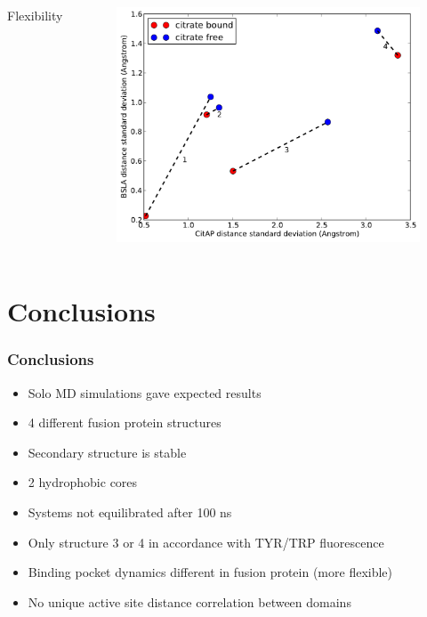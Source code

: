 \documentclass[english]{beamer}
\begin{document}
\begin{frame}
\begin{columns}[]
        \vfill
        \centering
        Flexibility
        \begin{figure}
            \includegraphics[width=\textwidth]{figures/CitAP_BSLA_distance/BSLA_CitAP_analyzed_with_standard_deviation.pdf}  
        \end{figure}      

    \end{columns}    

    \vfill 

\end{frame}        
 

\section{Conclusions}

\begin{frame}
    \frametitle{Conclusions}

    \begin{itemize}
        \item<1-> Solo MD simulations gave expected results
        \item<2-> 4 different fusion protein structures
        \item<3-> Secondary structure is stable
        \item<4-> 2 hydrophobic cores
        \item<5-> Systems not equilibrated after 100 ns
        \item<6-> Only structure 3 or 4 in accordance with TYR/TRP fluorescence
        \item<7-> Binding pocket dynamics different in fusion protein (more flexible)
        \item<8-> No unique active site distance correlation between domains
    \end{itemize}

\end{frame}        
\end{document}
